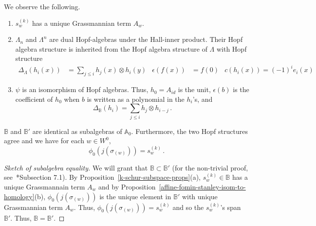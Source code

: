 \documentclass[11pt,leqno,oneside]{amsart}
\numberwithin{thm}{section}
\newcommand{\A}{\mathbb{A}}
\newcommand{\B}{\mathbb{B}}
\newcommand{\sym}{\Lambda}
\begin{document}
\begin{prop}\label{k-schur-subspace-props}
  We observe the following.
  \begin{enumerate}
  \item \(s_w^{(k)}\) has a unique Grassmannian term \(A_w\).
  \item \(\sym_n\) and \(\sym^n\) are dual Hopf-algebras under the
    Hall-inner product. Their Hopf algebra structure is inherited from
    the Hopf algebra structure of \(\sym\) with Hopf structure
    \begin{align*}
      \Delta_{\sym}(h_i(x)) & = \sum_{j \leq i} h_j(x) \otimes h_i(y)
      & \epsilon(f(x)) & = f(0) & c(h_i(x)) = (-1)^i e_i(x)
    \end{align*}
  \item \(\psi\) is an isomorphism of Hopf algebras. Thus, \(h_0 =
    A_{id}\) is the unit, \(\epsilon(b)\) is the coefficient of
    \(h_0\) when \(b\) is written as a polynomial in the \(h_i\)'s,
    and \[
      \Delta_\B(h_i) = \sum_{j \leq i} h_j \otimes h_{i-j} \,.
    \]
  \end{enumerate}
\end{prop}
\begin{thm}\label{affine-fomin-stanley-equal}
  \(\B\) and \(\B'\) are identical as subalgebras of
  \(\A_0\). Furthermore, the two Hopf structures agree and we have for
  each \(w \in W^0\), \[
    \phi_0(j(\sigma_{(w)})) = s_w^{(k)} \,.
  \]
\end{thm}
\begin{proof}[Sketch of subalgebra equality]
  We will grant that \(\B \subset \B'\) (for the non-trivial proof,
  see~\cite{lam}*{Subsection
    7.1}). By Proposition~\ref{k-schur-subspace-props}(a), \(s_w^{(k)} \in \B\)
  has a 
  unique Grassmannain term \(A_w\) and by
  Proposition~\ref{affine-fomin-stanley-isom-to-homology}(b), 
  \(\phi_0(j(\sigma_{(w)}))\) is the unique element in \(\B'\) with
  unique Grassmannian term \(A_w\). Thus, \(\phi_0(j(\sigma_{(w)})) =
  s_w^{(k)}\) and so the \(s_w^{(k)}\)'s span \(\B'\). Thus, \(\B = \B'\).
\end{proof}
\end{document}
